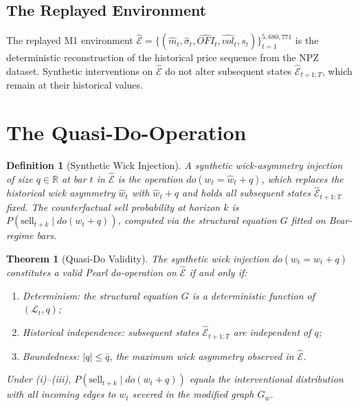 \documentclass[12pt]{article}
\newtheorem{theorem}{Theorem}
\newtheorem{definition}{Definition}
\begin{document}
\subsection{The Replayed Environment}

The replayed M1 environment
$\hat{\mathcal{E}} = \{(\hat{m}_t, \hat{\sigma}_t,
\widehat{\mathit{OFI}}_t, \widehat{\mathit{vol}}_t, s_t)\}_{t=1}^{5{,}680{,}771}$
is the deterministic reconstruction of the historical price sequence
from the NPZ dataset.
Synthetic interventions on $\hat{\mathcal{E}}$ do not alter subsequent
states $\hat{\mathcal{E}}_{t+1:T}$, which remain at their historical values.

\section{The Quasi-Do-Operation}
\label{sec:quasido}

\begin{definition}[Synthetic Wick Injection]
A synthetic wick-asymmetry injection of size $q \in \mathbb{R}$ at bar
$t$ in $\hat{\mathcal{E}}$ is the operation
$do(w_t = \hat{w}_t + q)$,
which replaces the historical wick asymmetry $\hat{w}_t$ with
$\hat{w}_t + q$ and holds all subsequent states
$\hat{\mathcal{E}}_{t+1:T}$ fixed.
The counterfactual sell probability at horizon $k$ is
$P(\text{sell}_{t+k} \mid do(w_t + q))$,
computed via the structural equation $G$ fitted on Bear-regime bars.
\end{definition}

\begin{theorem}[Quasi-Do Validity]
\label{thm:quasido}
The synthetic wick injection $do(w_t = \hat{w}_t + q)$ constitutes
a valid Pearl do-operation on $\hat{\mathcal{E}}$ if and only if:
\begin{enumerate}
\item[(i)] \textit{Determinism:} the structural equation
           $G$ is a deterministic function of $(\mathcal{L}_t, q)$;
\item[(ii)] \textit{Historical independence:} subsequent states
            $\hat{\mathcal{E}}_{t+1:T}$ are independent of $q$;
\item[(iii)] \textit{Boundedness:} $|q| \leq \bar{q}$, the maximum
             wick asymmetry observed in $\hat{\mathcal{E}}$.
\end{enumerate}
Under (i)--(iii), $P(\text{sell}_{t+k} \mid do(w_t + q))$ equals the
interventional distribution with all incoming edges to $w_t$ severed
in the modified graph $G_{\overline{w}}$.
\end{theorem}
\end{document}
